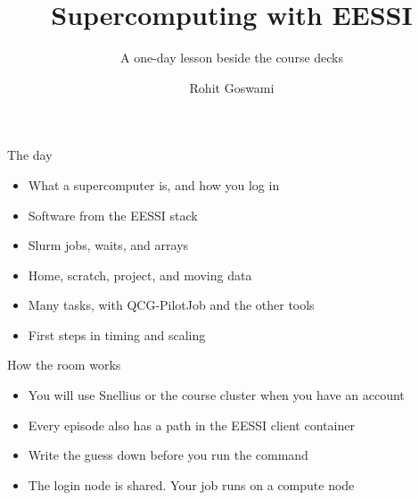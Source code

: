 \documentclass[t]{beamer}
\title{Supercomputing with EESSI}
\subtitle{A one-day lesson beside the course decks}
\author{Rohit Goswami}
\date{}
\begin{document}
\frame{\titlepage}

\begin{frame}{The day}
\begin{itemize}
  \item What a supercomputer is, and how you log in
  \item Software from the EESSI stack
  \item Slurm jobs, waits, and arrays
  \item Home, scratch, project, and moving data
  \item Many tasks, with QCG-PilotJob and the other tools
  \item First steps in timing and scaling
\end{itemize}
\end{frame}

\begin{frame}{How the room works}
\begin{itemize}
  \item You will use Snellius or the course cluster when you have an account
  \item Every episode also has a path in the EESSI client container
  \item Write the guess down before you run the command
  \item The login node is shared. Your job runs on a compute node
\end{itemize}
\end{frame}
\end{document}
